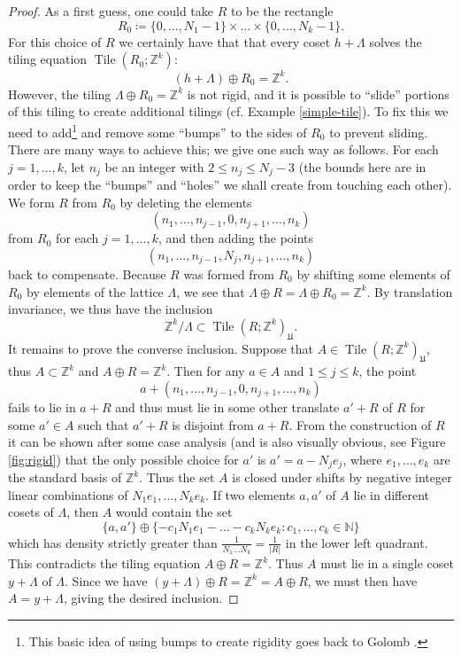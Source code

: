 \documentclass[reqno,a4paper,12pt]{amsart}
\numberwithin{equation}{section}
\numberwithin{figure}{section}
\def\Z{\mathbb{Z}}
\def\N{\mathbb{N}}
\renewcommand\leq{\leqslant}
\newcommand{\Tile}{\operatorname{Tile}}
\newcommand{\Universe}{{\mathfrak{U}}}
\theoremstyle{plain}
\theoremstyle{definition}
\begin{document}
\begin{proof}  As a first guess, one could take $R$ to be the rectangle
$$ R_0 \coloneqq \{ 0,\dots,N_1-1\} \times \dots \times \{0,\dots,N_k-1\}.$$
For this choice of $R$ we certainly have that that every coset $h+\Lambda$ solves the tiling equation $\Tile(R_0;\Z^k)$:
$$ (h+\Lambda) \oplus R_0 = \Z^k.$$
However, the tiling $\Lambda \oplus R_0 = \Z^k$ is not rigid, and it is possible to ``slide'' portions of this tiling to create additional tilings (cf. Example \ref{simple-tile}). To fix this we need to add\footnote{This basic idea of using bumps to create rigidity goes back to Golomb \cite{golomb}.} and remove some ``bumps'' to the sides of $R_0$ to prevent sliding.  There are many ways to achieve this; we give one such way as follows.  For each $j=1,\dots,k$, let $n_j$ be an integer with $2 \leq n_j \leq N_j-3$ (the bounds here are in order to keep the ``bumps'' and ``holes'' we shall create from touching each other).  We form $R$ from $R_0$ by deleting the elements
$$ (n_1,\dots,n_{j-1},0,n_{j+1},\dots,n_k)$$
from $R_0$ for each $j=1,\dots,k$, and then adding the points
$$ (n_1,\dots,n_{j-1},N_j,n_{j+1},\dots,n_k)$$
back to compensate.  Because $R$ was formed from $R_0$ by shifting some elements of $R_0$ by elements of the lattice $\Lambda$, we see that $\Lambda \oplus R = \Lambda \oplus R_0 = \Z^k$.  By translation invariance, we thus have the inclusion
$$\Z^k / \Lambda \subset \Tile(R;\Z^k)_\Universe.$$
It remains to prove the converse inclusion.  Suppose that $A \in  \Tile(R;\Z^k)_\Universe$, thus $A \subset \Z^k$ and $A \oplus R = \Z^k$.  Then for any $a \in A$ and $1 \leq j \leq k$, the point
$$ a + (n_1,\dots,n_{j-1},0,n_{j+1},\dots,n_k)$$
fails to lie in $a+R$ and thus must lie in some other translate $a'+R$ of $R$ for some $a' \in A$ such that $a'+R$ is disjoint from $a+R$.  From the construction of $R$ it can be shown after some case analysis (and is also visually obvious, see Figure \ref{fig:rigid}) that the only possible choice for $a'$ is $a' = a - N_j e_j$, where $e_1,\dots,e_k$ are the standard basis of $\Z^k$.  Thus the set $A$ is closed under shifts by negative integer linear combinations of $N_1 e_1, \dots, N_k e_k$.  If two elements $a, a'$ of $A$ lie in different cosets of $\Lambda$, then $A$ would contain the set
$$ \{ a, a'\} \oplus \{ -c_1 N_1 e_1 - \dots - c_k N_k e_k: c_1,\dots,c_k \in \N \}$$
which has density strictly greater than $\frac{1}{N_1 \dots N_k} = \frac{1}{|R|}$ in the lower left quadrant.  This contradicts the tiling equation $A \oplus R = \Z^k$.  Thus $A$ must lie in a single coset $y+\Lambda$ of $\Lambda$.  Since we have $(y+\Lambda) \oplus R = \Z^k = A \oplus R$, we must then have $A = y+\Lambda$, giving the desired inclusion.
\end{proof}
\end{document}
